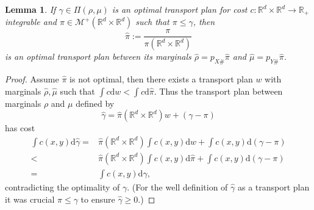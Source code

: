 \documentclass[11pt, oneside, titlepage]{book}
\theoremstyle{plain}
\newtheorem{lemma}[theorem]{Lemma}
\theoremstyle{definition}
\newcommand{\R}{\mathbb{R}}
\newcommand{\di}{\mathrm{d}}
\begin{document}
\begin{lemma}
\label{app: subplan is optimal}
If $\gamma \in \Pi(\rho, \mu)$ is an optimal transport plan for cost $c: \R^d \times \R^d \to \R_+$ integrable and $\pi\in \mathcal{M}^+(\R^d \times \R^d)$ such that $\pi \leq \gamma$, then
\begin{equation*}
    \hat\pi := \frac{\pi}{\pi(\R^d \times \R^d)}
\end{equation*}
is an optimal transport plan between its marginals $\hat\rho = p_{X\#}\hat\pi$ and $\hat\mu = p_{Y\#}\hat\pi$.
\end{lemma}
\begin{proof}
Assume $\hat\pi$ is not optimal, then there exists a transport plan $w$ with marginals $\hat\rho, \hat\mu$ such that $\int c \di w  < \int c \di \hat\pi$. Thus the transport plan between marginals $\rho$ and $\mu$ defined by
\begin{equation*}
    \hat\gamma = \hat\pi(\R^d \times \R^d)w + (\gamma - \pi)
\end{equation*}
has cost
\begin{align*}
    \int c(x, y) \di \hat\gamma =& \hat\pi(\R^d \times \R^d)\int c(x, y) \di w + \int c(x, y) \di (\gamma - \pi)\\
    <&\hat\pi(\R^d \times \R^d)\int c(x, y) \di \hat\pi + \int c(x, y) \di (\gamma - \pi)\\
    =&\int c(x, y) \di \gamma,
\end{align*}
contradicting the optimality of $\gamma$. (For the well definition of $\hat\gamma$ as a transport plan it was crucial $\pi \leq \gamma$ to ensure $\hat\gamma \geq 0$.)
\end{proof}

    
\end{document}
